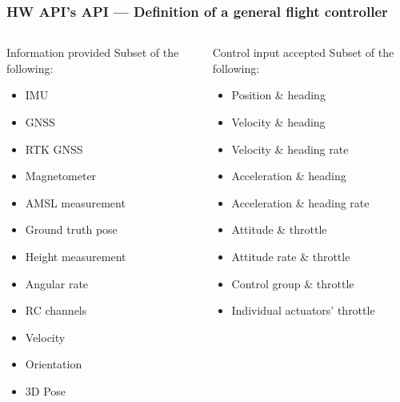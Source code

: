 \documentclass[aspectratio=169,9pt]{beamer}
\begin{document}
\begin{frame}
  \frametitle{HW API's API --- Definition of a general flight controller}

  \begin{columns}[c]

    \begin{block}{Information provided}
      Subset of the following:
      \begin{itemize}
        \item IMU
        \item GNSS
        \item RTK GNSS
        \item Magnetometer
        \item AMSL measurement
        \item Ground truth pose
        \item Height measurement
        \item Angular rate
        \item RC channels
        \item Velocity
        \item Orientation
        \item 3D Pose
      \end{itemize}
    \end{block}

    \begin{block}{Control input accepted}
      Subset of the following:
      \begin{itemize}
        \item Position \& heading
        \item Velocity \& heading
        \item Velocity \& heading rate
        \item Acceleration \& heading
        \item Acceleration \& heading rate
        \item Attitude \& throttle
        \item Attitude rate \& throttle
        \item Control group \& throttle
        \item Individual actuators' throttle
      \end{itemize}
    \end{block}

  \end{columns}

\end{frame}
\end{document}
